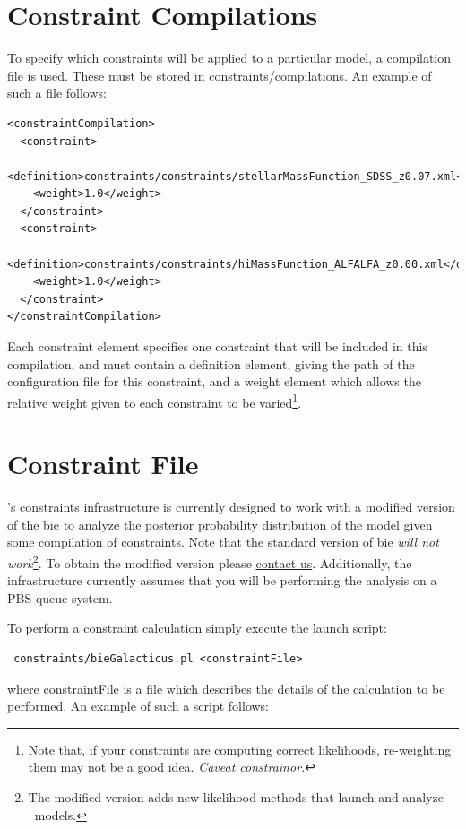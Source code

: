 \section{Constraint Compilations}

To specify which constraints will be applied to a particular model, a compilation file is used. These must be stored in {\normalfont \ttfamily constraints/compilations}. An example of such a file follows:
\begin{verbatim}
<constraintCompilation>
  <constraint>
    <definition>constraints/constraints/stellarMassFunction_SDSS_z0.07.xml</definition>
    <weight>1.0</weight>
  </constraint>
  <constraint>
    <definition>constraints/constraints/hiMassFunction_ALFALFA_z0.00.xml</definition>
    <weight>1.0</weight>
  </constraint>
</constraintCompilation>
\end{verbatim}
Each {\normalfont \ttfamily constraint} element specifies one constraint that will be included in this compilation, and must contain a {\normalfont \ttfamily definition} element, giving the path of the configuration file for this constraint, and a {\normalfont \ttfamily weight} element which allows the relative weight given to each constraint to be varied\footnote{Note that, if your constraints are computing correct likelihoods, re-weighting them may not be a good idea. \emph{Caveat constrainor.}}.

\section{Constraint File}

\glc's constraints infrastructure is currently designed to work with a modified version of the \gls{bie} to analyze the posterior probability distribution of the model given some compilation of constraints. Note that the standard version of \gls{bie} \emph{will not work}\footnote{The modified version adds new likelihood methods that launch and analyze \protect\glc\ models.}. To obtain the modified version please \href{mailto:abenson@.carnegiescience.edu}{contact us}. Additionally, the infrastructure currently assumes that you will be performing the analysis on a PBS queue system.

To perform a constraint calculation simply execute the launch script:
\begin{verbatim}
 constraints/bieGalacticus.pl <constraintFile>
\end{verbatim}
where {\normalfont \ttfamily constraintFile} is a file which describes the details of the calculation to be performed. An example of such a script follows:

